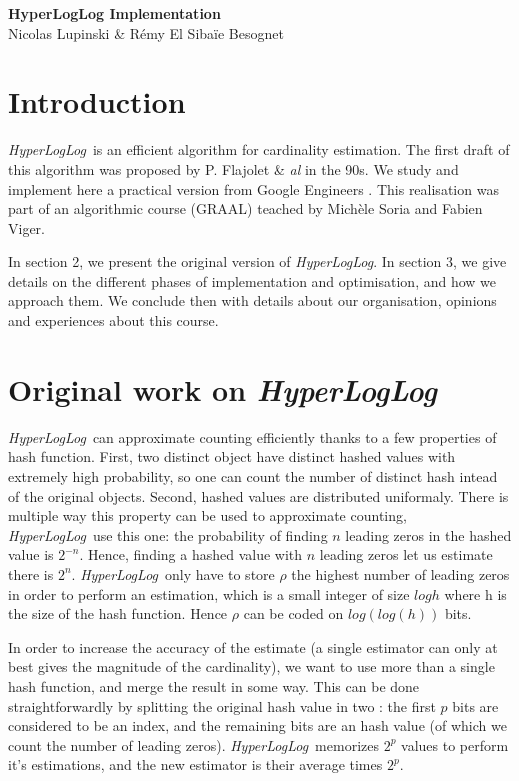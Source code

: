 \documentclass[12pt]{article}
\newcommand{\hll}{\emph{HyperLogLog}}
\begin{document}
\nocite{*}
\begin{center}
   {\Large\textbf{HyperLogLog Implementation}}
\medskip \\
   {\large  Nicolas Lupinski \& Rémy El Sibaïe Besognet}
\end{center}

\medskip\noindent

\medskip \noindent

\newpage

\tableofcontents

\newpage

\section{Introduction}

\hll\ is an efficient algorithm for cardinality estimation. The first
draft of this algorithm was proposed by P. Flajolet \& \emph{al} in
the 90s. We study and implement here a practical version from Google
Engineers \cite{HeuleNH13}.  This realisation was part of an
algorithmic course (GRAAL) teached by Michèle Soria and Fabien Viger.

In section 2, we present the original version of \hll. In section 3,
we give details on the different phases of implementation and
optimisation, and how we approach them. We conclude then with details
about our organisation, opinions and experiences about this course.

\section{Original work on \hll}

\hll\ can approximate counting efficiently thanks to a few properties
of hash function. First, two distinct object have distinct hashed values with
extremely high probability, so one can count the number of distinct
hash intead of the original objects. Second, hashed values are
distributed uniformaly. There is multiple way this property can be used
to approximate counting, \hll\ use this one: the probability of
finding $n$ leading zeros in the hashed value is $2^{-n}$. Hence,
finding a hashed value with $n$ leading zeros let us estimate there is
$2^{n}$. \hll\ only have to store $\rho$ the highest number of leading zeros
in order to perform an estimation, which is a small integer of size
$log h$ where h is the size of the hash function. Hence $\rho$ can be
coded on $log(log(h))$ bits.

In order to increase the accuracy of the estimate (a single estimator
can only at best gives the magnitude of the cardinality), we want to
use more than a single hash function, and merge the result in some
way. This can be done straightforwardly by splitting the original hash
value in two : the first $p$ bits are considered to be an index, and
the remaining bits are an hash value (of which we count the number of
leading zeros). \hll\ memorizes $2^{p}$ values to perform it's
estimations, and the new estimator is their average times $2^{p}$.
\end{document}
